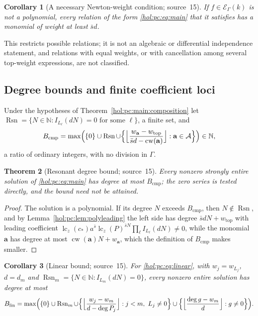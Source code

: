 \documentclass[11pt]{article}
\numberwithin{equation}{section}
\newtheorem{theorem}{Theorem}[section]
\newtheorem{corollary}[theorem]{Corollary}
\theoremstyle{definition}
\theoremstyle{remark}
\newcommand{\N}{\mathbb N}
\newcommand{\lc}{\operatorname{lc}}
\newcommand{\EK}{\mathcal E_\Gamma(k)}
\begin{document}
\begin{corollary}[A necessary Newton-weight condition; source~15]
\label{hol:pc:cor:newton}
If $f\in\EK$ is not a polynomial, every relation of the form
\eqref{hol:pc:eq:main} that it satisfies has a monomial of weight at least
$\bar sd$.
\end{corollary}

This restricts possible relations; it is not an algebraic or differential
independence statement, and relations with equal weights, or with cancellation
among several top-weight expressions, are not classified.

\subsection{Degree bounds and finite coefficient loci}\label{hol:pc:sub:degree}

Under the hypotheses of Theorem~\ref{hol:pc:main:composition} let
$\operatorname{Rsn}=\{N\in\N:I_{L_\ell}(dN)=0\text{ for some }\ell\}$, a finite
set, and
\begin{equation}\label{hol:pc:eq:B}
 B_{\mathrm{cmp}}=\max\Bigl(\{0\}\cup\operatorname{Rsn}\cup\Bigl\{\Bigl\lfloor
 \frac{w_{\mathbf a}-w_{\mathrm{top}}}{\bar sd-\operatorname{cw}(\mathbf a)}
 \Bigr\rfloor:\mathbf a\in\mathcal A\Bigr\}\Bigr)\in\N ,
\end{equation}
a ratio of ordinary integers, with no division in $\Gamma$.

\begin{theorem}[Resonant degree bound; source~15]\label{hol:pc:thm:bound}
Every nonzero strongly entire solution of \eqref{hol:pc:eq:main} has degree at
most $B_{\mathrm{cmp}}$; the zero series is tested directly, and the bound need not
be attained.
\end{theorem}

\begin{proof}
The solution is a polynomial. If its degree $N$ exceeds $B_{\mathrm{cmp}}$, then
$N\notin\operatorname{Rsn}$, and by Lemma~\ref{hol:pc:lem:polyleading} the left
side has degree $\bar sdN+w_{\mathrm{top}}$ with leading coefficient
$\lc_z(c_*)a^{\bar s}\lc_z(P)^{\bar sN}\prod_\ell I_{L_\ell}(dN)\ne0$, while the
monomial $\mathbf a$ has degree at most $\operatorname{cw}(\mathbf a)N+w_{\mathbf
a}$, which the definition of $B_{\mathrm{cmp}}$ makes smaller.
\end{proof}

\begin{corollary}[Linear bound; source~15]\label{hol:pc:cor:linearbound}
For \eqref{hol:pc:eq:linear}, with $w_j=w_{L_j}$, $d=d_m$ and
$\operatorname{Rsn}_m=\{N\in\N:I_{L_m}(dN)=0\}$, every nonzero entire solution
has degree at most
\[
 B_{\mathrm{lin}}=\max\Bigl(\{0\}\cup\operatorname{Rsn}_m\cup\Bigl\{\Bigl\lfloor
 \frac{w_j-w_m}{d-\deg P_j}\Bigr\rfloor:j<m,\ L_j\ne0\Bigr\}\cup\Bigl\{\Bigl\lfloor
 \frac{\deg g-w_m}{d}\Bigr\rfloor:g\ne0\Bigr\}\Bigr).
\]
\end{corollary}
\end{document}

